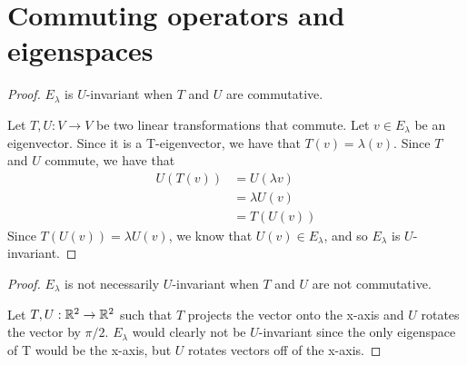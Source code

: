 \section{Commuting operators and eigenspaces}
\begin{proof} $E_\lambda$ is $U$-invariant when $T$ and $U$ are commutative. \gap
    
    Let $T, U: V \rightarrow V$ be two linear transformations that commute.
    Let $v \in  E_\lambda$ be an eigenvector.
    Since it is a T-eigenvector, we have that $T(v) = \lambda(v)$.
    Since $T$ and $U$ commute, we have that
    \begin{align}
        U(T(v)) 
        &= U(\lambda v) \\
        &= \lambda U(v) \\
        &= T(U(v))
    \end{align}
    Since $T(U(v)) = \lambda U(v)$, 
    we know that $U(v) \in E_\lambda$,
    and so $E_\lambda$ is $U$-invariant.\gap
\end{proof}

\begin{proof}
    $E_\lambda$ is not necessarily $U$-invariant 
    when $T$ and $U$ are not commutative.\gap

    Let $T, U: \mathbb{R}^2 \rightarrow \mathbb{R}^2$ such that
    $T$ projects the vector onto the x-axis 
    and $U$ rotates the vector by $\pi/2$.
    $E_\lambda$ would clearly not be $U$-invariant since 
    the only eigenspace of T would be the x-axis, but
    $U$ rotates vectors off of the x-axis.
\end{proof}